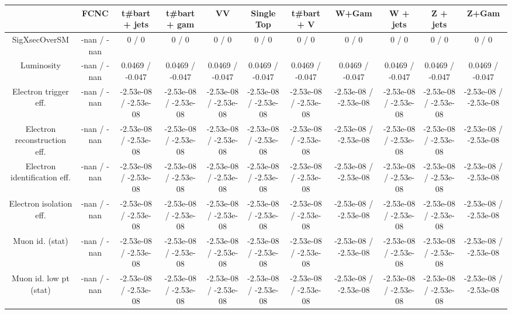 \begin{table}[htbp]
\begin{center}
\footnotesize
\begin{tabular}{|c|c|c|c|c|c|c|c|c|c|c|}
\hline 
      & FCNC      & t#bar{t} + jets      & t#bar{t} +  gam      & VV      & Single Top      & t#bar{t} + V      & W+Gam      & W + jets      & Z + jets      & Z+Gam \\ 
\hline 
 SigXsecOverSM & -nan / -nan & 0 / 0 & 0 / 0 & 0 / 0 & 0 / 0 & 0 / 0 & 0 / 0 & 0 / 0 & 0 / 0 & 0 / 0 \\ 
  Luminosity & -nan / -nan & 0.0469 / -0.047 & 0.0469 / -0.047 & 0.0469 / -0.047 & 0.0469 / -0.047 & 0.0469 / -0.047 & 0.0469 / -0.047 & 0.0469 / -0.047 & 0.0469 / -0.047 & 0.0469 / -0.047 \\ 
  Electron trigger eff. & -nan / -nan & -2.53e-08 / -2.53e-08 & -2.53e-08 / -2.53e-08 & -2.53e-08 / -2.53e-08 & -2.53e-08 / -2.53e-08 & -2.53e-08 / -2.53e-08 & -2.53e-08 / -2.53e-08 & -2.53e-08 / -2.53e-08 & -2.53e-08 / -2.53e-08 & -2.53e-08 / -2.53e-08 \\ 
  Electron reconstruction eff. & -nan / -nan & -2.53e-08 / -2.53e-08 & -2.53e-08 / -2.53e-08 & -2.53e-08 / -2.53e-08 & -2.53e-08 / -2.53e-08 & -2.53e-08 / -2.53e-08 & -2.53e-08 / -2.53e-08 & -2.53e-08 / -2.53e-08 & -2.53e-08 / -2.53e-08 & -2.53e-08 / -2.53e-08 \\ 
  Electron identification eff. & -nan / -nan & -2.53e-08 / -2.53e-08 & -2.53e-08 / -2.53e-08 & -2.53e-08 / -2.53e-08 & -2.53e-08 / -2.53e-08 & -2.53e-08 / -2.53e-08 & -2.53e-08 / -2.53e-08 & -2.53e-08 / -2.53e-08 & -2.53e-08 / -2.53e-08 & -2.53e-08 / -2.53e-08 \\ 
  Electron isolation eff. & -nan / -nan & -2.53e-08 / -2.53e-08 & -2.53e-08 / -2.53e-08 & -2.53e-08 / -2.53e-08 & -2.53e-08 / -2.53e-08 & -2.53e-08 / -2.53e-08 & -2.53e-08 / -2.53e-08 & -2.53e-08 / -2.53e-08 & -2.53e-08 / -2.53e-08 & -2.53e-08 / -2.53e-08 \\ 
  Muon id. (stat) & -nan / -nan & -2.53e-08 / -2.53e-08 & -2.53e-08 / -2.53e-08 & -2.53e-08 / -2.53e-08 & -2.53e-08 / -2.53e-08 & -2.53e-08 / -2.53e-08 & -2.53e-08 / -2.53e-08 & -2.53e-08 / -2.53e-08 & -2.53e-08 / -2.53e-08 & -2.53e-08 / -2.53e-08 \\ 
  Muon id. low pt (stat) & -nan / -nan & -2.53e-08 / -2.53e-08 & -2.53e-08 / -2.53e-08 & -2.53e-08 / -2.53e-08 & -2.53e-08 / -2.53e-08 & -2.53e-08 / -2.53e-08 & -2.53e-08 / -2.53e-08 & -2.53e-08 / -2.53e-08 & -2.53e-08 / -2.53e-08 & -2.53e-08 / -2.53e-08 \\ 

\end{tabular}
\end{center}
\end{table}
